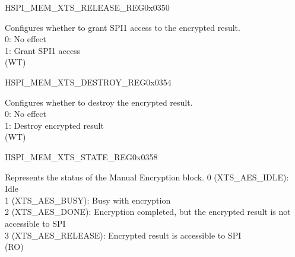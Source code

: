 \begin{register}{H}{SPI\_MEM\_XTS\_RELEASE\_REG}{0x0350}\label{regdesc:SPIMEMXTSRELEASEREG}
%
%
\regnewline%
\begin{regdesc}\begin{reglist}
\label{fielddesc:SPIMEMXTSRELEASE}\item [SPI\_MEM\_XTS\_RELEASE] Configures whether to grant SPI1 access to the encrypted result. \\
0: No effect\\
1: Grant SPI1 access\\
(WT)
\end{reglist}\end{regdesc}
\end{register}

\begin{register}{H}{SPI\_MEM\_XTS\_DESTROY\_REG}{0x0354}\label{regdesc:SPIMEMXTSDESTROYREG}
%
%
\regnewline%
\begin{regdesc}\begin{reglist}
\label{fielddesc:SPIMEMXTSDESTROY}\item [SPI\_MEM\_XTS\_DESTROY] Configures whether to destroy the encrypted result. \\
0: No effect\\
1: Destroy encrypted result\\
(WT)
\end{reglist}\end{regdesc}
\end{register}


\begin{register}{H}{SPI\_MEM\_XTS\_STATE\_REG}{0x0358}\label{regdesc:SPIMEMXTSSTATEREG}
%
%
\regnewline%
\begin{regdesc}\begin{reglist}
\label{fielddesc:SPIMEMXTSSTATE}\item [SPI\_MEM\_XTS\_STATE] Represents the status of the Manual Encryption block.
0 (XTS\_AES\_IDLE): Idle\\
1 (XTS\_AES\_BUSY): Busy with encryption\\
2 (XTS\_AES\_DONE): Encryption completed, but the encrypted result is not accessible to SPI\\
3 (XTS\_AES\_RELEASE): Encrypted result is accessible to SPI\\
(RO)
\end{reglist}\end{regdesc}
\end{register}


